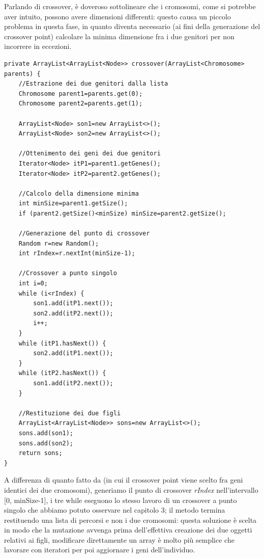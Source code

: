 Parlando di crossover, \`e doveroso sottolineare che i cromosomi, come si potrebbe aver intuito, possono avere dimensioni differenti: questo causa un piccolo problema in questa fase, in quanto diventa necessario (ai fini della generazione del crossover point) calcolare la minima dimensione fra i due genitori per non incorrere in eccezioni.
\begin{lstlisting}[style=Java]
private ArrayList<ArrayList<Node>> crossover(ArrayList<Chromosome> parents) {
	//Estrazione dei due genitori dalla lista
	Chromosome parent1=parents.get(0);
	Chromosome parent2=parents.get(1);
	
	ArrayList<Node> son1=new ArrayList<>();
	ArrayList<Node> son2=new ArrayList<>();
	
	//Ottenimento dei geni dei due genitori
	Iterator<Node> itP1=parent1.getGenes();
	Iterator<Node> itP2=parent2.getGenes();
	
	//Calcolo della dimensione minima
	int minSize=parent1.getSize();
	if (parent2.getSize()<minSize) minSize=parent2.getSize();
	
	//Generazione del punto di crossover
	Random r=new Random();
	int rIndex=r.nextInt(minSize-1);
	
	//Crossover a punto singolo
	int i=0;
	while (i<rIndex) {
		son1.add(itP1.next());
		son2.add(itP2.next());
		i++;
	}
	while (itP1.hasNext()) {
		son2.add(itP1.next());
	}
	while (itP2.hasNext()) {
		son1.add(itP2.next());
	}
	
	//Restituzione dei due figli
	ArrayList<ArrayList<Node>> sons=new ArrayList<>();
	sons.add(son1);
	sons.add(son2);
	return sons;
}
\end{lstlisting}
A differenza di quanto fatto da \cite{path3} (in cui il crossover point viene scelto fra geni identici dei due cromosomi), generiamo il punto di crossover \textit{rIndex} nell'intervallo [0, minSize-1], i tre while eseguono lo stesso lavoro di un crossover a punto singolo che abbiamo potuto osservare nel capitolo 3; il metodo termina restituendo una lista di percorsi e non i due cromosomi: questa soluzione \`e scelta in modo che la mutazione avvenga prima dell'effettiva creazione dei due oggetti relativi ai figli, modificare direttamente un array \`e molto pi\`u semplice che lavorare con iteratori per poi aggiornare i geni dell'individuo.
\vspace{3mm}

